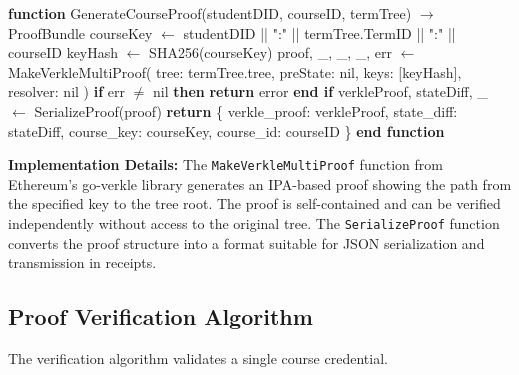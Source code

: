 \begin{algorithm}[H]
\caption{GenerateCourseProof - Generate Single Course Proof}
\label{alg:generate-course-proof}
\begin{algorithmic}[1]
\STATE \textbf{function} GenerateCourseProof(studentDID, courseID, termTree) $\rightarrow$ ProofBundle
\STATE \quad courseKey $\leftarrow$ studentDID || ":" || termTree.TermID || ":" || courseID
\STATE \quad keyHash $\leftarrow$ SHA256(courseKey)
\STATE
\STATE \quad proof, \_, \_, \_, err $\leftarrow$ MakeVerkleMultiProof(
\STATE \quad \quad tree: termTree.tree,
\STATE \quad \quad preState: nil, 
\STATE \quad \quad keys: [keyHash], 
\STATE \quad \quad resolver: nil 
\STATE \quad )
\STATE
\STATE \quad \textbf{if} err $\neq$ nil \textbf{then}
\STATE \quad \quad \textbf{return} error
\STATE \quad \textbf{end if}
\STATE
\STATE \quad verkleProof, stateDiff, \_ $\leftarrow$ SerializeProof(proof)
\STATE \quad {}
\STATE
\STATE \quad \textbf{return} \{
\STATE \quad \quad verkle\_proof: verkleProof,
\STATE \quad \quad state\_diff: stateDiff,
\STATE \quad \quad course\_key: courseKey,
\STATE \quad \quad course\_id: courseID
\STATE \quad \}
\STATE \textbf{end function}
\end{algorithmic}
\end{algorithm}

\textbf{Implementation Details:} The \texttt{MakeVerkleMultiProof} function from Ethereum's go-verkle library generates an IPA-based proof showing the path from the specified key to the tree root. The proof is self-contained and can be verified independently without access to the original tree. The \texttt{SerializeProof} function converts the proof structure into a format suitable for JSON serialization and transmission in receipts.

\subsection{Proof Verification Algorithm}
\label{subsec:proof-verify-algo}

The verification algorithm validates a single course credential.

